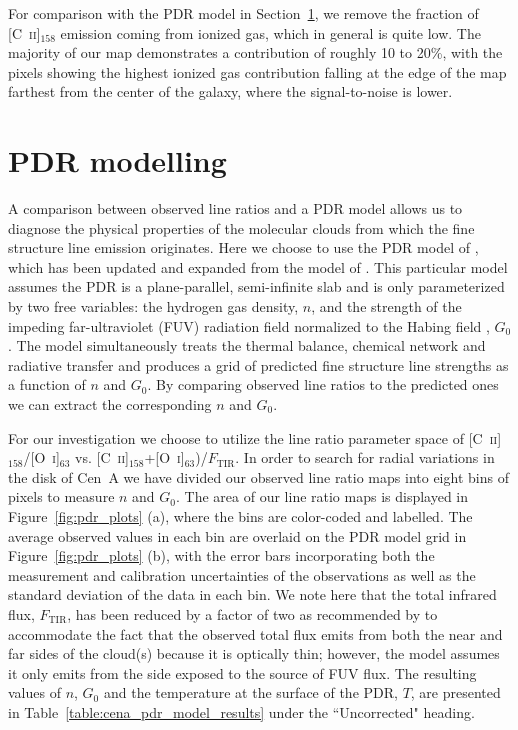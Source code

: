 For comparison with the PDR model in Section~\ref{pdr_model4}, we remove the fraction of [C~\textsc{ii}]$_{158}$ emission coming from ionized gas, which in general is quite low.  The majority of our map demonstrates a contribution of roughly 10 to 20\%, with the pixels showing the highest ionized gas contribution falling at the edge of the map farthest from the center of the galaxy, where the signal-to-noise is lower.


\section{PDR modelling}\label{pdr_model4}

A comparison between observed line ratios and a PDR model allows us to diagnose the physical properties of the molecular clouds from which the fine structure line emission originates.  Here we choose to use the PDR model of \citet{1999ApJ...527..795K,2006ApJ...644..283K}, which has been updated and expanded from the model of \citet{1985ApJ...291..722T}.  This particular model assumes the PDR is a plane-parallel, semi-infinite slab and is only parameterized by two free variables: the hydrogen gas density, $n$, and the strength of the impeding far-ultraviolet (FUV) radiation field normalized to the Habing field \citep[$1.6 \times 10^{-3}$~erg~cm$^{-2}$~s$^{-1}$; ][]{1968BAN....19..421H}, $G_{0}$.  The model simultaneously treats the thermal balance, chemical network and radiative transfer and produces a grid of predicted fine structure line strengths as a function of $n$ and $G_{0}$.  By comparing observed line ratios to the predicted ones we can extract the corresponding $n$ and $G_{0}$.

For our investigation we choose to utilize the line ratio parameter space of [C~\textsc{ii}]$_{158}$/[O~\textsc{i}]$_{63}$ vs. [C~\textsc{ii}]$_{158}$+[O~\textsc{i}]$_{63}$)/$F_{\mathrm{TIR}}$.  In order to search for radial variations in the disk of Cen~A we have divided our observed line ratio maps into eight bins of pixels to measure $n$ and $G_{0}$.  The area of our line ratio maps is displayed in Figure~\ref{fig:pdr_plots} (a), where the bins are color-coded and labelled.  The average observed values in each bin are overlaid on the PDR model grid in Figure~\ref{fig:pdr_plots} (b), with the error bars incorporating both the measurement and calibration uncertainties of the observations as well as the standard deviation of the data in each bin.  We note here that the total infrared flux, $F_{\mathrm{TIR}}$, has been reduced by a factor of two as recommended by \citet{1999ApJ...527..795K} to accommodate the fact that the observed total flux emits from both the near and far sides of the cloud(s) because it is optically thin; however, the model assumes it only emits from the side exposed to the source of FUV flux.  The resulting values of $n$, $G_{0}$ and the temperature at the surface of the PDR, $T$, are presented in Table~\ref{table:cena_pdr_model_results} under the ``Uncorrected" heading.

